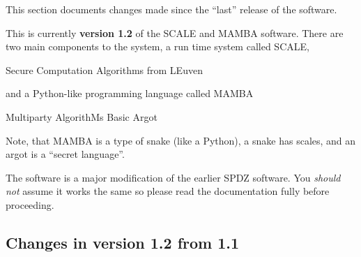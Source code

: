 
This section documents changes made since the ``last'' release of
the software. 

\vspace{5mm}

\noindent
This is currently {\bf version 1.2} of the SCALE and MAMBA software.
There are two main components to the system, a run time system called
SCALE,
\begin{center}
  Secure Computation Algorithms from LEuven
\end{center}
and a Python-like programming language called MAMBA
\begin{center}
  Multiparty AlgorithMs Basic Argot
\end{center}
Note, that MAMBA is a type of snake (like a Python), a snake
has scales, and an argot is a ``secret language''.

\vspace{5mm}

\noindent
The software is a major modification of the earlier SPDZ software. 
You {\em should not} assume it works the same so please read
the documentation fully before proceeding.

\subsection{Changes in version 1.2 from 1.1}

